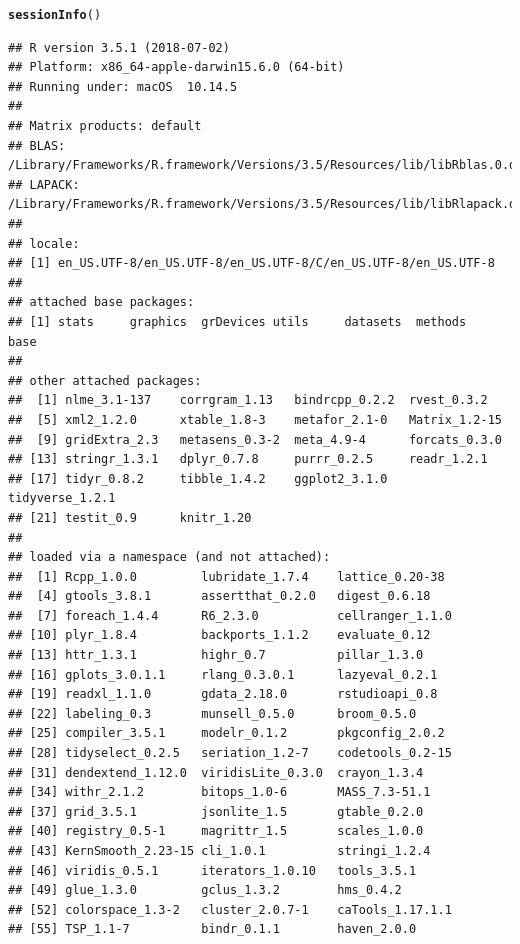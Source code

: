 \documentclass[11pt,a4paper,twoside]{book}\usepackage[]{graphicx}\usepackage[]{color}
\makeatletter
\newcommand{\hlstd}[1]{\textcolor[rgb]{0.345,0.345,0.345}{#1}}%
\newcommand{\hlkwd}[1]{\textcolor[rgb]{0.737,0.353,0.396}{\textbf{#1}}}%
\newenvironment{kframe}{%
 \def\at@end@of@kframe{}%
 \ifinner\ifhmode%
  \def\at@end@of@kframe{\end{minipage}}%
  \begin{minipage}{\columnwidth}%
 \fi\fi%
 \def\FrameCommand##1{\hskip\@totalleftmargin \hskip-\fboxsep
 \colorbox{shadecolor}{##1}\hskip-\fboxsep
     \hskip-\linewidth \hskip-\@totalleftmargin \hskip\columnwidth}%
 \MakeFramed {\advance\hsize-\width
   \@totalleftmargin\z@ \linewidth\hsize
   \@setminipage}}%
 {\par\unskip\endMakeFramed%
 \at@end@of@kframe}
\newenvironment{knitrout}{}{} %
\makeatother
\begin{document}
\begin{knitrout}
\color{fgcolor}\begin{kframe}
\begin{alltt}
\hlkwd{sessionInfo}\hlstd{()}
\end{alltt}
\begin{verbatim}
## R version 3.5.1 (2018-07-02)
## Platform: x86_64-apple-darwin15.6.0 (64-bit)
## Running under: macOS  10.14.5
## 
## Matrix products: default
## BLAS: /Library/Frameworks/R.framework/Versions/3.5/Resources/lib/libRblas.0.dylib
## LAPACK: /Library/Frameworks/R.framework/Versions/3.5/Resources/lib/libRlapack.dylib
## 
## locale:
## [1] en_US.UTF-8/en_US.UTF-8/en_US.UTF-8/C/en_US.UTF-8/en_US.UTF-8
## 
## attached base packages:
## [1] stats     graphics  grDevices utils     datasets  methods   base     
## 
## other attached packages:
##  [1] nlme_3.1-137    corrgram_1.13   bindrcpp_0.2.2  rvest_0.3.2    
##  [5] xml2_1.2.0      xtable_1.8-3    metafor_2.1-0   Matrix_1.2-15  
##  [9] gridExtra_2.3   metasens_0.3-2  meta_4.9-4      forcats_0.3.0  
## [13] stringr_1.3.1   dplyr_0.7.8     purrr_0.2.5     readr_1.2.1    
## [17] tidyr_0.8.2     tibble_1.4.2    ggplot2_3.1.0   tidyverse_1.2.1
## [21] testit_0.9      knitr_1.20     
## 
## loaded via a namespace (and not attached):
##  [1] Rcpp_1.0.0         lubridate_1.7.4    lattice_0.20-38   
##  [4] gtools_3.8.1       assertthat_0.2.0   digest_0.6.18     
##  [7] foreach_1.4.4      R6_2.3.0           cellranger_1.1.0  
## [10] plyr_1.8.4         backports_1.1.2    evaluate_0.12     
## [13] httr_1.3.1         highr_0.7          pillar_1.3.0      
## [16] gplots_3.0.1.1     rlang_0.3.0.1      lazyeval_0.2.1    
## [19] readxl_1.1.0       gdata_2.18.0       rstudioapi_0.8    
## [22] labeling_0.3       munsell_0.5.0      broom_0.5.0       
## [25] compiler_3.5.1     modelr_0.1.2       pkgconfig_2.0.2   
## [28] tidyselect_0.2.5   seriation_1.2-7    codetools_0.2-15  
## [31] dendextend_1.12.0  viridisLite_0.3.0  crayon_1.3.4      
## [34] withr_2.1.2        bitops_1.0-6       MASS_7.3-51.1     
## [37] grid_3.5.1         jsonlite_1.5       gtable_0.2.0      
## [40] registry_0.5-1     magrittr_1.5       scales_1.0.0      
## [43] KernSmooth_2.23-15 cli_1.0.1          stringi_1.2.4     
## [46] viridis_0.5.1      iterators_1.0.10   tools_3.5.1       
## [49] glue_1.3.0         gclus_1.3.2        hms_0.4.2         
## [52] colorspace_1.3-2   cluster_2.0.7-1    caTools_1.17.1.1  
## [55] TSP_1.1-7          bindr_0.1.1        haven_2.0.0
\end{verbatim}
\end{kframe}
\end{knitrout}
\end{document}
